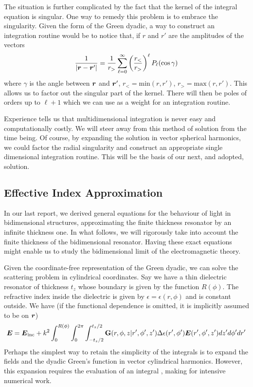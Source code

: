 The situation  is 
further complicated by the fact that the kernel of the integral equation is singular. 
One way to remedy this problem is to embrace the singularity. Given the form
of the Green dyadic, a way to construct an integration routine would be
to notice that, if $r$ and $r'$ are the amplitudes of the vectors
  \begin{equation}
   \frac{1}{|\boldsymbol{r}-\boldsymbol{r}'|} = \frac{1}{r_>}\sum_{\ell=0}^\infty \left(\frac{r_<}{r_>}\right)^\ell P_\ell(\cos\gamma)
  \end{equation}
where $\gamma$ is the angle between $\boldsymbol{r}$ and $\boldsymbol{r}'$, $r_<=\text{min}(r,r')$, 
$r_>=\text{max}(r,r')$. 
This allows us to factor out the singular part of the kernel. There will 
then be poles of orders up to $\ell+1$ which we can use
as a weight for an integration routine.

Experience tells us that multidimensional integration is never easy and 
computationally costly. We will steer away from this method of solution
from the time being. Of course, by expanding the solution in 
vector spherical harmonics, we could factor the radial singularity
and construct an appropriate single dimensional integration routine. 
This will be the basis of our next, and adopted, solution.

\subsection{Effective Index Approximation}
In our last report, we derived general equations for the
behaviour of light in bidimensional structures, approximating 
the finite thickness resonator by an infinite thickness one. In 
what follows, we will rigorously take into account the finite thickness
of the bidimensional resonator. Having these exact equations might enable us
to study the bidimensional limit of the electromagnetic theory. 

Given the coordinate-free representation of the Green dyadic, we can solve
the scattering problem in cylindrical coordinates. Say  we have
a thin dielectric resonator of thickness $t_z$ whose boundary is given
by the function $R(\phi)$. The refractive
index inside the dielectric is given by $\epsilon=\epsilon(r,\phi)$ and
is constant outside. We have (if the functional dependence is omitted, it is implicitly
assumed to be on $\boldsymbol{r}$)
  \begin{equation}
   \boldsymbol{E} = \boldsymbol{E}_\text{inc}
	  +k^2\int_{0}^{R(\phi)}\int_0^{2\pi}\int_{-t_z/2}^{t_z/2}\mathbf{G}(r,\phi,z|r',\phi',z')\Delta\epsilon(r',\phi')\boldsymbol{E}(r',\phi',z')dz'd\phi'dr'
  \end{equation}
Perhaps the simplest way to retain the simplicity of the integrals is to expand the fields and the dyadic Green's function
in vector cylindrical harmonics. However, this expansion requires the evaluation of an integral \cite{BEN1968}, making 
for intensive numerical work. 

